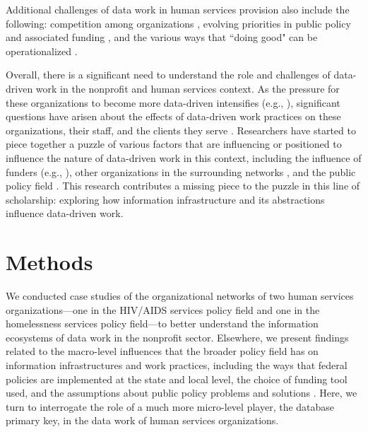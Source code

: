 Additional challenges of data work in human services provision also include the following: competition among organizations \citep{Stoll2010Interorg,LeDantec2010Boundaries}, evolving priorities in public policy and associated funding \citep{Benjamin2018Policy}, and the various ways that ``doing good" can be operationalized \citep{Benjamin2012FrontOut, Voida2014SharedValues}. 

Overall, there is a significant need to understand the role and challenges of data-driven work in the nonprofit and human services context. As the pressure for these organizations to become more data-driven intensifies (e.g., \citep{Haskins2011Building}), significant questions have arisen about the effects of data-driven work practices on these organizations, their staff, and the clients they serve \citep{Benjamin2008Risk,Benjamin2012FrontOut,Benjamin2018Policy,Bopp2017DbD,LeDantec2008Trenches,Ebrahim2003NGOs,Carman2007Evaluation,Snibbe2006Drown}. Researchers have started to piece together a puzzle of various factors that are influencing or positioned to influence the nature of data-driven work in this context, including the influence of funders (e.g., \citep{Benjamin2008Account,Bopp2017DbD,Cutt2000Accountability,Ebrahim2003NGOs,Stoecker2007Research,Smith1993Contracting}), other organizations in the surrounding networks \citep{MacIndoe2013Shape}, and the public policy field \citep{Benjamin2018Policy}. This research contributes a missing piece to the puzzle in this line of scholarship: exploring how information infrastructure and its abstractions influence data-driven work.

\section{Methods}
We conducted case studies of the organizational networks of two human services organizations---one in the HIV/AIDS services policy field and one in the homelessness services policy field---to better understand the information ecosystems of data work in the nonprofit sector. Elsewhere, we present findings related to the macro-level influences that the broader policy field has on information infrastructures and work practices, including the ways that federal policies are implemented at the state and local level, the choice of funding tool used, and the assumptions about public policy problems and solutions \citep{Benjamin2018Policy}. Here, we turn to interrogate the role of a much more micro-level player, the database primary key, in the data work of human services organizations. 

